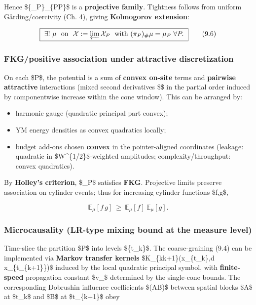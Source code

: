 \documentclass[
]{article}
\providecommand{\tightlist}{%
  \setlength{\itemsep}{0pt}\setlength{\parskip}{0pt}}
\numberwithin{equation}{section}
\begin{document}
Hence \$\{\mu\_P\}\_\{P\in\mathscr P\}\$ is a \textbf{projective
family}. Tightness follows from uniform Gårding/coercivity (Ch. 4),
giving \textbf{Kolmogorov extension}:

\[
\boxed{\ \exists!\ \mu\ \text{ on }\ \mathcal X:=\varprojlim \mathcal X_P\ \text{ with }(\pi_P)_\#\mu=\mu_P\ \forall P.\ }
\tag{9.6}
\]

\hypertarget{fkgpositive-association-under-attractive-discretization}{%
\subsubsection{FKG/positive association under attractive
discretization}\label{fkgpositive-association-under-attractive-discretization}}

On each \$P\$, the potential is a sum of \textbf{convex on-site} terms
and \textbf{pairwise attractive} interactions (mixed second derivatives
\$\$ in the partial order induced by componentwise increase within
the cone window). This can be arranged by:

\begin{itemize}
\tightlist
\item
  harmonic gauge (quadratic principal part convex);
\item
  YM energy densities as convex quadratics locally;
\item
  budget add-ons chosen \textbf{convex} in the pointer-aligned
  coordinates (leakage: quadratic in \$W\^{}\{1/2\}\$-weighted
  amplitudes; complexity/throughput: convex quadratics).
\end{itemize}

By \textbf{Holley's criterion}, \$\mu\_P\$ satisfies \textbf{FKG}.
Projective limits preserve association on cylinder events; thus for
increasing cylinder functions \$f,g\$,

\[
\mathbb E_\mu[f\,g]\ \ge\ \mathbb E_\mu[f]\ \mathbb E_\mu[g].
\tag{9.7}
\]

\hypertarget{microcausality-lr-type-mixing-bound-at-the-measure-level}{%
\subsubsection{Microcausality (LR-type mixing bound at the measure
level)}\label{microcausality-lr-type-mixing-bound-at-the-measure-level}}

Time-slice the partition \$P\$ into levels \$\{t\_k\}\$. The
coarse-graining (9.4) can be implemented via \textbf{Markov transfer
kernels} \$K\_\{k\to k+1\}(x\_\{t\_k\},\mathrm d x\_\{t\_\{k+1\}\})\$
induced by the local quadratic principal symbol, with
\textbf{finite-speed} propagation constant \$v\_\ast\$ determined by the
single-cone bounds. The corresponding Dobrushin influence coefficients
\$\alpha(A\to B)\$ between spatial blocks \$A\$ at \$t\_k\$ and \$B\$ at
\$t\_\{k+1\}\$ obey
\end{document}
